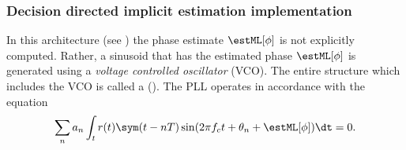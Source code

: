 
\subsubsection{Decision directed implicit estimation implementation}
In this architecture (see )  
the phase estimate $\estML[\phi]$ is 
not explicitly computed.
Rather, a sinusoid that has the estimated phase $\estML[\phi]$ is generated
using a {\em voltage controlled oscillator} (VCO). 
The entire structure which includes the VCO is called a 
 ().
The PLL operates in accordance with the equation
\[
   \sum_n a_n \int_t r(t)\sym(t-nT)\sin(2\pi f_c t+\theta_n+\estML[\phi]) \dt = 0.
\]

